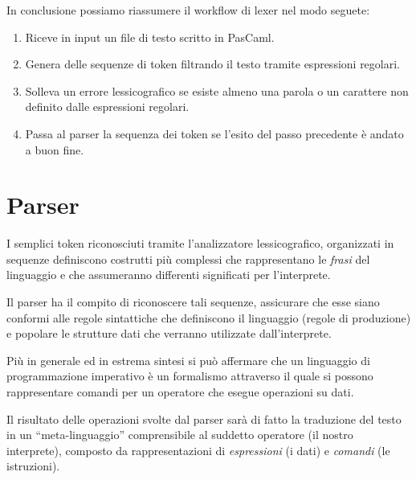 \documentclass[a4paper,10pt]{article}
\begin{document}
In conclusione possiamo riassumere il workflow di lexer nel modo seguete:
\begin{enumerate}
\item Riceve in input un file di testo scritto in PasCaml.
\item Genera delle sequenze di token filtrando il testo tramite espressioni 
regolari.
\item Solleva un errore lessicografico se esiste almeno una parola o un 
carattere non definito dalle espressioni regolari.
\item Passa al parser la sequenza dei token se l'esito del passo precedente \`e 
andato a buon fine.
\end{enumerate}

\section{Parser}
I semplici token riconosciuti tramite l'analizzatore lessicografico,
organizzati in sequenze definiscono costrutti pi\`u complessi che rappresentano
le \textit{frasi} del linguaggio e che assumeranno differenti significati per
l'interprete.

Il parser ha il compito di riconoscere tali sequenze, assicurare che esse siano
conformi alle regole sintattiche che definiscono il linguaggio (regole di
produzione) e popolare le strutture dati che verranno utilizzate
dall'interprete.

Pi\`u in generale ed in estrema sintesi si può affermare che un
linguaggio di
programmazione imperativo \`e un formalismo attraverso il quale si possono
rappresentare comandi per un operatore che esegue operazioni su dati.

Il risultato delle operazioni svolte dal parser sar\`a di fatto la traduzione
del testo in un ``meta-linguaggio'' comprensibile al suddetto operatore (il
nostro interprete), composto da rappresentazioni di \textit{espressioni} (i
dati) e \textit{comandi} (le istruzioni).
\end{document}
